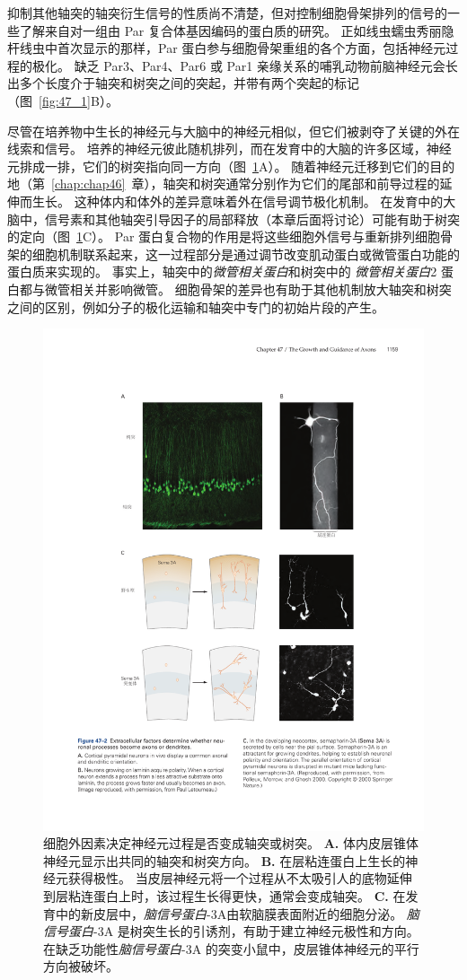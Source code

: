 抑制其他轴突的轴突衍生信号的性质尚不清楚，但对控制细胞骨架排列的信号的一些了解来自对一组由 Par 复合体基因编码的蛋白质的研究。
正如线虫蠕虫秀丽隐杆线虫中首次显示的那样，Par 蛋白参与细胞骨架重组的各个方面，包括神经元过程的极化。
缺乏 Par3、Par4、Par6 或 Par1 亲缘关系的哺乳动物前脑神经元会长出多个长度介于轴突和树突之间的突起，并带有两个突起的标记（图~\ref{fig:47_1}B）。


尽管在培养物中生长的神经元与大脑中的神经元相似，但它们被剥夺了关键的外在线索和信号。
培养的神经元彼此随机排列，而在发育中的大脑的许多区域，神经元排成一排，它们的树突指向同一方向（图~\ref{fig:47_2}A）。
随着神经元迁移到它们的目的地（第~\ref{chap:chap46}~章），轴突和树突通常分别作为它们的尾部和前导过程的延伸而生长。
这种体内和体外的差异意味着外在信号调节极化机制。 在发育中的大脑中，信号素和其他轴突引导因子的局部释放（本章后面将讨论）可能有助于树突的定向（图~\ref{fig:47_2}C）。
Par 蛋白复合物的作用是将这些细胞外信号与重新排列细胞骨架的细胞机制联系起来，这一过程部分是通过调节改变肌动蛋白或微管蛋白功能的蛋白质来实现的。
事实上，轴突中的\textit{微管相关蛋白}和树突中的 \textit{微管相关蛋白}2 蛋白都与微管相关并影响微管。
细胞骨架的差异也有助于其他机制放大轴突和树突之间的区别，例如分子的极化运输和轴突中专门的初始片段的产生。


\begin{figure}[htbp]
	\centering
	\includegraphics[width=0.85\linewidth]{chap47/fig_47_2}
	\caption{细胞外因素决定神经元过程是否变成轴突或树突。
		\textbf{A.} 体内皮层锥体神经元显示出共同的轴突和树突方向。
		\textbf{B.} 在层粘连蛋白上生长的神经元获得极性。
		当皮层神经元将一个过程从不太吸引人的底物延伸到层粘连蛋白上时，该过程生长得更快，通常会变成轴突。
		\textbf{C.} 在发育中的新皮层中，\textit{脑信号蛋白}-3A由软脑膜表面附近的细胞分泌。
		\textit{脑信号蛋白}-3A 是树突生长的引诱剂，有助于建立神经元极性和方向。
		在缺乏功能性\textit{脑信号蛋白}-3A 的突变小鼠中，皮层锥体神经元的平行方向被破坏。}
	\label{fig:47_2}
\end{figure}


